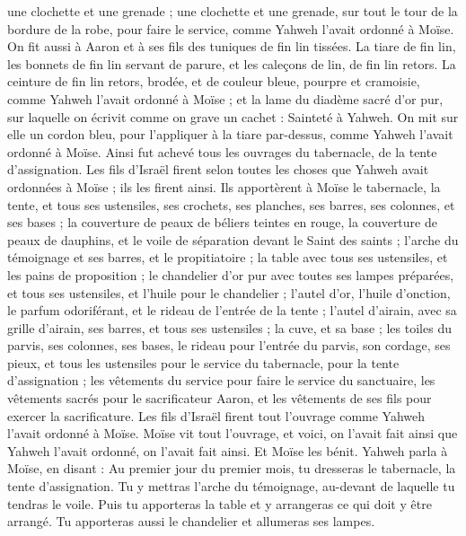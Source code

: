 \begin{multicols}{2}
une clochette et une grenade ; une clochette et une grenade, sur tout le tour de la bordure de la robe, pour faire le service, comme Yahweh l'avait ordonné à Moïse.
On fit aussi à Aaron et à ses fils des tuniques de fin lin tissées.
La tiare de fin lin, les bonnets de fin lin servant de parure, et les caleçons de lin, de fin lin retors.
La ceinture de fin lin retors, brodée, et de couleur bleue, pourpre et cramoisie, comme Yahweh l'avait ordonné à Moïse ;
et la lame du diadème sacré d’or pur, sur laquelle on écrivit comme on grave un cachet : Sainteté à Yahweh.
On mit sur elle un cordon bleu, pour l'appliquer à la tiare par-dessus, comme Yahweh l'avait ordonné à Moïse.
Ainsi fut achevé tous les ouvrages du tabernacle, de la tente d'assignation. Les fils d'Israël firent selon toutes les choses que Yahweh avait ordonnées à Moïse ; ils les firent ainsi.
Ils apportèrent à Moïse le tabernacle, la tente, et tous ses ustensiles, ses crochets, ses planches, ses barres, ses colonnes, et ses bases ;
la couverture de peaux de béliers teintes en rouge, la couverture de peaux de dauphins, et le voile de séparation devant le Saint des saints ;
l'arche du témoignage et ses barres, et le propitiatoire ;
la table avec tous ses ustensiles, et les pains de proposition ;
le chandelier d’or pur avec toutes ses lampes préparées, et tous ses ustensiles, et l'huile pour le chandelier ;
l'autel d'or, l'huile d'onction, le parfum odoriférant, et le rideau de l’entrée de la tente ;
l'autel d'airain, avec sa grille d'airain, ses barres, et tous ses ustensiles ; la cuve, et sa base ;
les toiles du parvis, ses colonnes, ses bases, le rideau pour l’entrée du parvis, son cordage, ses pieux, et tous les ustensiles pour le service du tabernacle, pour la tente d'assignation ;
les vêtements du service pour faire le service du sanctuaire, les vêtements sacrés pour le sacrificateur Aaron, et les vêtements de ses fils pour exercer la sacrificature.
Les fils d'Israël firent tout l'ouvrage comme Yahweh l'avait ordonné à Moïse.
Moïse vit tout l'ouvrage, et voici, on l'avait fait ainsi que Yahweh l'avait ordonné, on l'avait fait ainsi. Et Moïse les bénit.
\VerseOne{}Yahweh parla à Moïse, en disant :
Au premier jour du premier mois, tu dresseras le tabernacle, la tente d'assignation.
Tu y mettras l'arche du témoignage, au-devant de laquelle tu tendras le voile.
Puis tu apporteras la table et y arrangeras ce qui doit y être arrangé. Tu apporteras aussi le chandelier et allumeras ses lampes.

\end{multicols}
